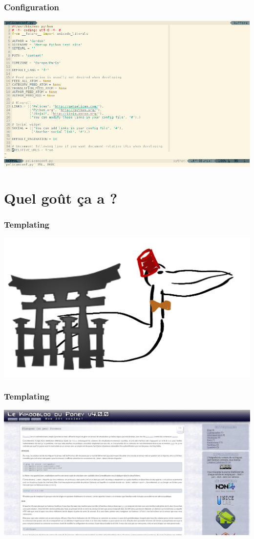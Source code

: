 \documentclass[frenchb,francais]{beamer}
\begin{document}
\begin{frame}
    \frametitle{Configuration}
    \begin{center}\includegraphics[scale=.34]{img/pelicanconf.png}\end{center}
\end{frame}

\section{Quel goût ça a ?}

\begin{frame}
    \frametitle{Templating}
    \begin{center}\includegraphics[scale=.15]{img/jinja.png}\end{center}
\end{frame}

\begin{frame}
    \frametitle{Templating}
    \begin{center}\includegraphics[scale=.15]{img/gordon_re.png}\end{center}
\end{frame}
\end{document}
